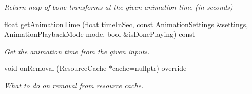 \begin{Indent}
\begin{DoxyCompactItemize}
\begin{DoxyCompactList}\small\item\em Return map of bone transforms at the given animation time (in seconds) \end{DoxyCompactList}\item 
\mbox{\label{classrev_1_1_animation_a6e598616f9992b4f1adbd1d5d58c95ed}} 
float \mbox{\hyperlink{classrev_1_1_animation_a6e598616f9992b4f1adbd1d5d58c95ed}{get\+Animation\+Time}} (float time\+In\+Sec, const \mbox{\hyperlink{structrev_1_1_animation_settings}{Animation\+Settings}} \&settings, Animation\+Playback\+Mode mode, bool \&is\+Done\+Playing) const
\begin{DoxyCompactList}\small\item\em Get the animation time from the given inputs. \end{DoxyCompactList}\item 
\mbox{\label{classrev_1_1_animation_a461f736b34f017cca7fc77f5e0f0716b}} 
void \mbox{\hyperlink{classrev_1_1_animation_a461f736b34f017cca7fc77f5e0f0716b}{on\+Removal}} (\mbox{\hyperlink{classrev_1_1_resource_cache}{Resource\+Cache}} $\ast$cache=nullptr) override
\begin{DoxyCompactList}\small\item\em What to do on removal from resource cache. \end{DoxyCompactList}\end{DoxyCompactItemize}
\end{Indent}
